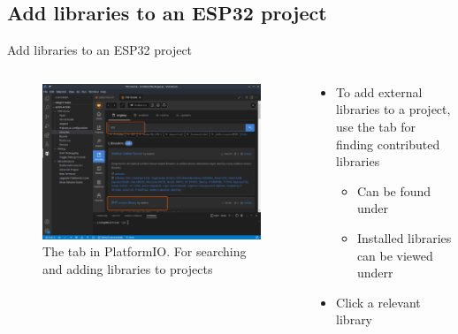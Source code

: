 \documentclass[aspectratio=169]{beamer}
\begin{document}
\subsection{Add libraries to an ESP32 project}
\begin{frame}{Add libraries to an ESP32 project}
\begin{columns}
	\begin{column}{0.5\textwidth}
		\begin{figure}
  			\includegraphics[width=\textwidth,keepaspectratio=true]{assets/pictures/pio-libraries.png}
  			\caption{The  tab in PlatformIO. For searching and adding libraries to projects}
  			\label{fig:pio-libraries}
		\end{figure}
	\end{column}
	\begin{column}{0.5\textwidth}
		\begin{textBox}
			\begin{itemize}
				\item To add external libraries to a project, use the  tab for finding contributed libraries
				\begin{itemize}
					\item Can be found under 
					\item Installed libraries can be viewed underr 
				\end{itemize}
				\item Click a relevant library
			\end{itemize}
		\end{textBox}
	\end{column}
\end{columns}
\end{frame}
\end{document}
